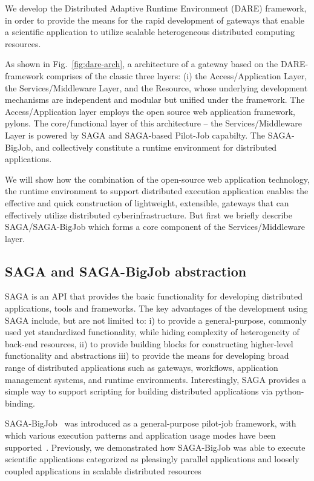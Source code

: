 \documentclass{sig-alternate}
\begin{document}
We develop the Distributed Adaptive Runtime Environment (DARE)
framework\cite{dareurl}, in order to provide the means for the rapid
development of gateways that enable a scientific application to
utilize scalable heterogeneous distributed computing resources.

As shown in Fig.~\ref{fig:dare-arch}, a architecture of a gateway
based on the DARE-framework comprises of the classic three layers: (i)
the Access/Application Layer, the Services/Middleware Layer, and the
Resource, whose underlying development mechanisms are independent and
modular but unified under the framework.  The Access/Application layer
employs the open source web application framework,
pylons\cite{pylonsurl}.  The core/functional layer of this
architecture -- the Services/Middleware Layer is powered by SAGA and
SAGA-based Pilot-Job capabilty. The
SAGA-BigJob\cite{saga-ccgrid10,jha2009developing,ecmls10, ecmls11},
and collectively constitute a runtime environment for distributed
applications.

We will show how the combination of the open-source web application
technology, the runtime environment to support distributed execution
application enables the effective and quick construction of
lightweight, extensible, gateways that can effectively utilize
distributed cyberinfrastructure. But first we briefly describe
SAGA/SAGA-BigJob which forms a core component of the
Services/Middleware layer.

\subsection{SAGA and SAGA-BigJob abstraction}

SAGA is an API that provides the basic functionality for developing
distributed applications, tools and frameworks\cite{saga-web}. The key
advantages of the development using SAGA include, but are not limited
to: i) to provide a general-purpose, commonly used yet standardized
functionality, while hiding complexity of heterogeneity of back-end
resources, ii) to provide building blocks for constructing higher-level
functionality and abstractions iii) to provide the means for
developing broad range of distributed applications such as gateways,
workflows, application management systems, and runtime environments.
Interestingly, SAGA provides a simple way to support scripting
for building distributed applications via python-binding. 

SAGA-BigJob~\cite{saga-ccgrid10} was introduced as a general-purpose
pilot-job framework, with which various execution patterns and
application usage modes have been
supported~\cite{async_repex11,saga-royalsoc}.  Previously, we
demonstrated how SAGA-BigJob was able to execute scientific
applications categorized as pleasingly parallel applications and
loosely coupled applications in scalable distributed
resources\cite{jha2009developing, ecmls10, ecmls11}
\end{document}
